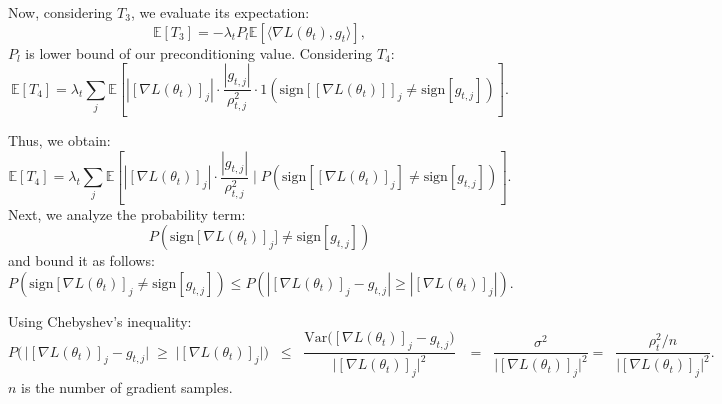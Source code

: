 \documentclass{article}
\theoremstyle{plain}
\theoremstyle{definition}
\theoremstyle{remark}
\begin{document}
\noindent
Now, considering $T_3$, we evaluate its expectation:
\begin{equation}
    \mathbb{E}[T_3] = -\lambda_t P_l \mathbb{E}[\langle \nabla L(\theta_t), g_t \rangle],
\end{equation}
$P_l$ is lower bound of our preconditioning value.
Considering $T_4$:
\begin{equation}
    \mathbb{E}[T_4] = \lambda_t \sum_j\mathbb{E}\left[|[\nabla L(\theta_{t})]_j| \cdot \frac{|g_{t,j}|}{\rho_{t,j}^2}  \cdot 1(\text{sign}[[\nabla L(\theta_t)]]_j \neq \text{sign}[g_{t,j}])\right].
\end{equation}

\noindent
Thus, we obtain:
\begin{equation}
    \mathbb{E}[T_4] = \lambda_t \sum_j\mathbb{E}\left[|[\nabla L(\theta_{t})]_j| \cdot \frac{|g_{t,j}|}{\rho_{t,j}^2} \mid P(\text{sign}[[\nabla L(\theta_t)]_j] \neq \text{sign}[g_{t,j}])\right].
\end{equation}
Next, we analyze the probability term:
\begin{equation}
    P(\text{sign}[\nabla L(\theta_t)]_j] \neq \text{sign}[g_{t,j}])
\end{equation}
and bound it as follows:
\begin{equation}
    P(\text{sign}[\nabla L(\theta_t)]_j \neq \text{sign}[g_{t,j}])
    \leq P(|[\nabla L(\theta_t)]_j - g_{t,j}| \geq |[\nabla L(\theta_t)]_j|).
\end{equation}

\noindent
Using Chebyshev's inequality:
\begin{equation}
    P\bigl(\,\bigl|[\nabla L(\theta_t)]_j - g_{t,j}\bigr| 
             \;\ge\; \bigl|[\nabla L(\theta_t)]_j\bigr|\bigr)
    \;\;\le\;\;
    \frac{\mathrm{Var}\!\bigl([\nabla L(\theta_t)]_j - g_{t,j}\bigr)}
         {\bigl|[\nabla L(\theta_t)]_j\bigr|^2}
    \;\;\ = \;\;
    \frac{\sigma^2}{\bigl|[\nabla L(\theta_t)]_j\bigr|^2} = \;\;
    \frac{\rho_t^2/n}{\bigl|[\nabla L(\theta_t)]_j\bigr|^2}.
\end{equation}
$n$ is the number of gradient samples.
\noindent
\end{document}
